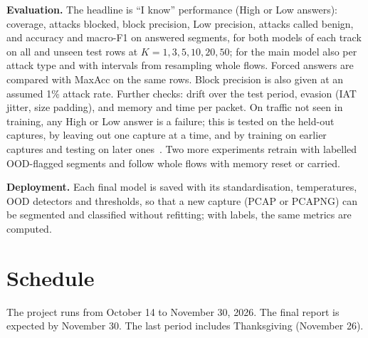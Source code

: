 \documentclass[11pt]{article}
\begin{document}
\textbf{Evaluation.} The headline is ``I know'' performance (High or Low answers): coverage, attacks blocked, block
precision, Low precision, attacks called benign, and accuracy and macro-F1 on answered segments, for both models of each
track on all and unseen test rows at $K = 1, 3, 5, 10, 20, 50$; for the main model also per attack type and with
intervals from resampling whole flows. Forced answers are compared with MaxAcc on the same rows. Block precision is
also given at an assumed 1\% attack rate. Further checks: drift over the test period, evasion (IAT jitter, size
padding), and memory and time per packet. On traffic not seen in training, any High or Low answer is a failure; this is
tested on the held-out captures, by leaving out one capture at a time, and by training on earlier captures and testing
on later ones~\cite{tesseract}. Two more experiments retrain with labelled OOD-flagged segments and follow whole flows
with memory reset or carried.

\textbf{Deployment.} Each final model is saved with its standardisation, temperatures, OOD detectors and thresholds,
so that a new capture (PCAP or PCAPNG) can be segmented and classified without refitting; with labels, the same metrics
are computed.



\section{Schedule}

The project runs from October 14 to November 30, 2026. The final report is expected by November 30. The last period includes Thanksgiving (November 26).
\end{document}
